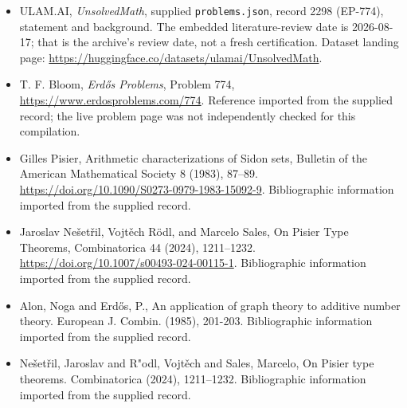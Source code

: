 \documentclass[11pt,a4paper]{article}
\begin{document}
{\small

\begin{itemize}

\item[\hypertarget{source:2298:1}{S1}] ULAM.AI, \emph{UnsolvedMath}, supplied \texttt{problems.json}, record 2298 (EP-774), statement and background. The embedded literature-review date is 2026-08-17; that is the archive’s review date, not a fresh certification. Dataset landing page: \url{https://huggingface.co/datasets/ulamai/UnsolvedMath}.

\item[\hypertarget{source:2298:2}{S2}] T. F. Bloom, \emph{Erdős Problems}, Problem 774, \url{https://www.erdosproblems.com/774}. Reference imported from the supplied record; the live problem page was not independently checked for this compilation.

\item[\hypertarget{source:2298:3}{S3}] Gilles Pisier, Arithmetic characterizations of Sidon sets, Bulletin of the American Mathematical Society 8 (1983), 87--89. \url{https://doi.org/10.1090/S0273-0979-1983-15092-9}. Bibliographic information imported from the supplied record.

\item[\hypertarget{source:2298:4}{S4}] Jaroslav Nešetřil, Vojtěch Rödl, and Marcelo Sales, On Pisier Type Theorems, Combinatorica 44 (2024), 1211--1232. \url{https://doi.org/10.1007/s00493-024-00115-1}. Bibliographic information imported from the supplied record.

\item[\hypertarget{source:2298:5}{S5}] Alon, Noga and Erd\H{o}s, P., An application of graph theory to additive number theory. European J. Combin. (1985), 201-203. Bibliographic information imported from the supplied record.

\item[\hypertarget{source:2298:6}{S6}] Ne\v set\v ril, Jaroslav and R"odl, Vojt\v ech and Sales, Marcelo, On {P}isier type theorems. Combinatorica (2024), 1211--1232. Bibliographic information imported from the supplied record.

\end{itemize}

}

\label{end:2298}
\end{document}
